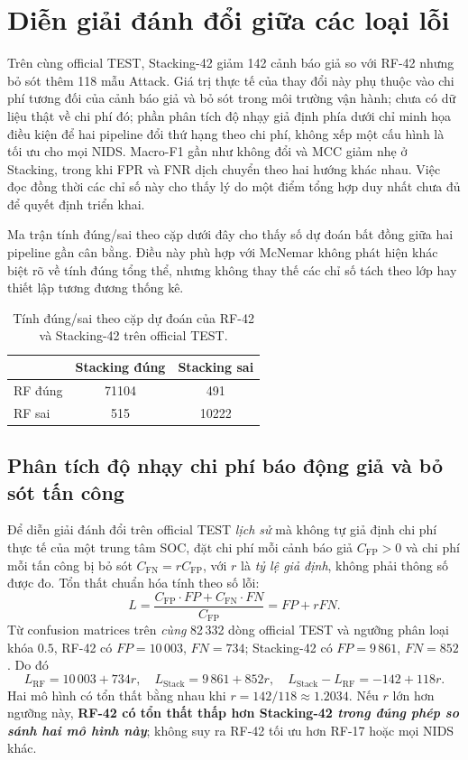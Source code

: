 \section{Diễn giải đánh đổi giữa các loại lỗi}
\label{sec:discussion-error-tradeoff}

Trên cùng official TEST, Stacking-42 giảm 142 cảnh báo giả so với RF-42 nhưng bỏ sót thêm 118 mẫu Attack. Giá trị thực tế của thay đổi này phụ thuộc vào chi phí tương đối của cảnh báo giả và bỏ sót trong môi trường vận hành; chưa có dữ liệu thật về chi phí đó; phần phân tích độ nhạy giả định phía dưới chỉ minh họa điều kiện để hai pipeline đổi thứ hạng theo chi phí, không xếp một cấu hình là tối ưu cho mọi NIDS. Macro-F1 gần như không đổi và MCC giảm nhẹ ở Stacking, trong khi FPR và FNR dịch chuyển theo hai hướng khác nhau. Việc đọc đồng thời các chỉ số này cho thấy lý do một điểm tổng hợp duy nhất chưa đủ để quyết định triển khai.

Ma trận tính đúng/sai theo cặp dưới đây cho thấy số dự đoán bất đồng giữa hai pipeline gần cân bằng. Điều này phù hợp với McNemar không phát hiện khác biệt rõ về tính đúng tổng thể, nhưng không thay thế các chỉ số tách theo lớp hay thiết lập tương đương thống kê.

\begin{table}[htbp]
\centering
\small
\renewcommand{\arraystretch}{1.3}
\setlength{\tabcolsep}{14pt}
\caption{Tính đúng/sai theo cặp dự đoán của RF-42 và Stacking-42 trên official TEST.}
\label{tab:paired-correctness}
\begin{tabular}{l S[table-format=5.0] S[table-format=5.0]}
\toprule
 & {Stacking đúng} & {Stacking sai}\\
\midrule
RF đúng & 71104 & 491\\
RF sai & 515 & 10222\\
\bottomrule
\end{tabular}
\end{table}

\subsection{Phân tích độ nhạy chi phí báo động giả và bỏ sót tấn công}
\label{sec:v4-fp-fn-cost}
Để diễn giải đánh đổi trên official TEST \emph{lịch sử} mà không tự giả định chi phí thực tế của một trung tâm SOC, đặt chi phí mỗi cảnh báo giả $C_{\mathrm{FP}}>0$ và chi phí mỗi tấn công bị bỏ sót $C_{\mathrm{FN}}=r C_{\mathrm{FP}}$, với $r$ là \emph{tỷ lệ giả định}, không phải thông số được đo. Tổn thất chuẩn hóa tính theo số lỗi:
\[
L=\frac{C_{\mathrm{FP}}\cdot FP+C_{\mathrm{FN}}\cdot FN}{C_{\mathrm{FP}}}=FP+r FN.
\]
Từ confusion matrices trên \emph{cùng} 82\,332 dòng official TEST và ngưỡng phân loại khóa $0.5$, RF-42 có $FP=10\,003$, $FN=734$; Stacking-42 có $FP=9\,861$, $FN=852$. Do đó
\[
L_{\mathrm{RF}}=10\,003+734r,\quad
L_{\mathrm{Stack}}=9\,861+852r,\quad
L_{\mathrm{Stack}}-L_{\mathrm{RF}}=-142+118r.
\]
Hai mô hình có tổn thất bằng nhau khi $r=142/118\approx1.2034$. Nếu $r$ lớn hơn ngưỡng này, \textbf{RF-42 có tổn thất thấp hơn Stacking-42 \emph{trong đúng phép so sánh hai mô hình này}}; không suy ra RF-42 tối ưu hơn RF-17 hoặc mọi NIDS khác.

